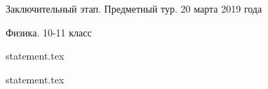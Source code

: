 \documentclass[a4paper,11pt, oneside]{book}
\begin{document}
\vspace{-3mm}
\vspace{-5mm}
\normalsize

\begin{center}
    Заключительный этап. Предметный тур. 20 марта 2019 года
    
    Физика. 10-11 класс
\end{center}

\parindent=0cm

{statement.tex}

{statement.tex}
\end{document}

